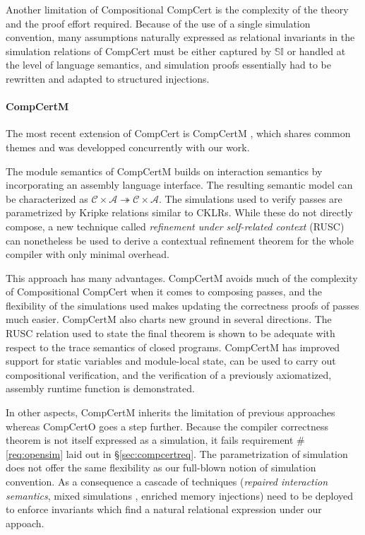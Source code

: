 \documentclass[sigplan,10pt,review,anonymous]{acmart}\settopmatter{printfolios=true,printccs=false,printacmref=false}
\begin{document}
Another limitation of Compositional CompCert
is the complexity of the theory
and the proof effort required.
Because of the use of a single simulation convention,
many assumptions naturally expressed as
relational invariants in the simulation relations of CompCert
must be either captured by $\mathbb{SI}$
or handled at the level of language semantics,
and simulation proofs
essentially had to be rewritten and adapted to
structured injections.


\paragraph{CompCertM} %

The most recent extension of CompCert is CompCertM \cite{compcertm},
which shares common themes and was developped concurrently
with our work.

The module semantics of CompCertM
builds on interaction semantics
by incorporating an assembly language interface.
The resulting semantic model can be characterized as
$\mathcal{C} \times \mathcal{A} \twoheadrightarrow
 \mathcal{C} \times \mathcal{A}$.
The simulations used to verify passes
are parametrized by Kripke relations similar to CKLRs.
While these do not directly compose,
a new technique called \emph{refinement under self-related context}
(RUSC)
can nonetheless be used to derive a contextual refinement theorem
for the whole compiler with only minimal overhead.

This approach has many advantages.
CompCertM avoids much of the complexity
of Compositional CompCert
when it comes to composing passes,
and the flexibility of the simulations used
makes updating the correctness proofs of passes much easier.
CompCertM also charts new ground in several directions.
The RUSC relation used to state the final theorem
is shown to be adequate with respect to the trace semantics
of closed programs.
CompCertM has improved support for static variables
and module-local state,
can be used to carry out compositional verification,
and the verification of a previously axiomatized,
assembly runtime function is demonstrated.

In other aspects,
CompCertM inherits the limitation of previous approaches
whereas CompCertO goes a step further.
Because the compiler correctness theorem
is not itself expressed as a simulation,
it fails requirement \#\ref{req:opensim}
laid out in \S\ref{sec:compcertreq}.
The parametrization of simulation
does not offer the same flexibility as
our full-blown notion of simulation convention.
As a consequence a cascade of techniques
(\emph{repaired interaction semantics},
mixed simulations \cite{pilsner},
enriched memory injections)
need to be deployed to enforce invariants
which find a natural relational expression
under our appoach.
\end{document}
